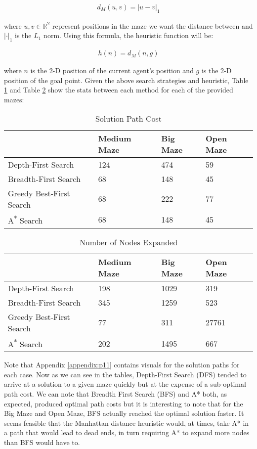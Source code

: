 \documentclass{article}[12pt]
\begin{document}
   \begin{align*}
   d_M(u,v) = |u - v|_1
   \end{align*}
   
   where $u, v \in \mathbb{R}^2$ represent positions in the maze we want the distance between and $|\cdot|_1$ is the $L_1$ norm. Using this formula, the heuristic function will be:
   
   \begin{align*}
   h(n) = d_M(n,g)
\end{align*}      
   
   where $n$ is the 2-D position of the current agent's position and $g$ is the 2-D position of the goal point. Given the above search strategies and heuristic, Table \ref{tab:sol11} and Table \ref{tab:nnode11} show the stats between each method for each of the provided mazes:
   
   \begin{table}[ht]
   \centering
   \begin{tabular}{l | l | l | l  }
   \hline
    & Medium Maze & Big Maze & Open Maze\\
    \hline \hline 
   Depth-First Search & 124 & 474 & 59 \\
   Breadth-First Search & 68 & 148 & 45 \\
   Greedy Best-First Search & 68 & 222 & 77 \\
   A\textsuperscript{*} Search & 68 & 148 & 45 \\
   \hline
   \end{tabular}
   \caption{Solution Path Cost} \label{tab:sol11}
   \end{table}
   
   \begin{table}[ht]
   \centering
   \begin{tabular}{l | l | l | l  }
   \hline
    & Medium Maze & Big Maze & Open Maze\\
    \hline \hline 
   Depth-First Search & 198 & 1029 & 319 \\
   Breadth-First Search & 345 & 1259 & 523 \\
   Greedy Best-First Search & 77 & 311 & 27761 \\
   A\textsuperscript{*} Search & 202 & 1495 & 667 \\
   \hline
   \end{tabular}
   \caption{Number of Nodes Expanded} \label{tab:nnode11}
   \end{table}
   
   Note that Appendix \ref{appendix:p11} contains visuals for the solution paths for each case. Now as we can see in the tables, Depth-First Search (DFS) tended to arrive at a solution to a given maze quickly but at the expense of a sub-optimal path cost. We can note that Breadth First Search (BFS) and A* both, as expected, produced optimal path costs but it is interesting to note that for the Big Maze and Open Maze, BFS actually reached the optimal solution faster. It seems feasible that the Manhattan distance heuristic would, at times, take A* in a path that would lead to dead ends, in turn requiring A* to expand more nodes than BFS would have to. 
   
\end{document}
